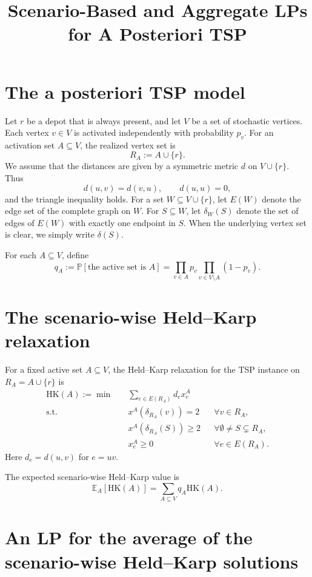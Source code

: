 \documentclass[11pt]{article}
\title{Scenario-Based and Aggregate LPs for A Posteriori TSP}
\author{}
\date{}
\newcommand{\E}{\mathbb{E}}
\newcommand{\Prb}{\mathbb{P}}
\newcommand{\HK}{\mathrm{HK}}
\begin{document}
\maketitle

\section{The a posteriori TSP model}

Let $r$ be a depot that is always present, and let $V$ be a set of stochastic vertices. Each vertex $v\in V$ is activated independently with probability $p_v$. For an activation set $A\subseteq V$, the realized vertex set is
\[
R_A := A\cup\{r\}.
\]
We assume that the distances are given by a symmetric metric $d$ on $V\cup\{r\}$. Thus
\[
d(u,v)=d(v,u), \qquad d(u,u)=0,
\]
and the triangle inequality holds. For a set $W\subseteq V\cup\{r\}$, let $E(W)$ denote the edge set of the complete graph on $W$. For $S\subseteq W$, let $\delta_W(S)$ denote the set of edges of $E(W)$ with exactly one endpoint in $S$. When the underlying vertex set is clear, we simply write $\delta(S)$.

For each $A\subseteq V$, define
\[
q_A := \Prb[\text{the active set is }A]
= \prod_{v\in A}p_v \prod_{v\in V\setminus A}(1-p_v).
\]

\section{The scenario-wise Held--Karp relaxation}

For a fixed active set $A\subseteq V$, the Held--Karp relaxation for the TSP instance on $R_A=A\cup\{r\}$ is
\[
\begin{aligned}
\HK(A):=\min \quad
& \sum_{e\in E(R_A)} d_e x^A_e \\
\text{s.t.}\quad
& x^A(\delta_{R_A}(v)) = 2
&& \forall v\in R_A, \\
& x^A(\delta_{R_A}(S)) \ge 2
&& \forall \emptyset\neq S\subsetneq R_A, \\
& x^A_e\ge 0
&& \forall e\in E(R_A).
\end{aligned}
\]
Here $d_e=d(u,v)$ for $e=uv$.

The expected scenario-wise Held--Karp value is
\[
\E_A[\HK(A)] = \sum_{A\subseteq V} q_A\HK(A).
\]

\section{An LP for the average of the scenario-wise Held--Karp solutions}
\end{document}
